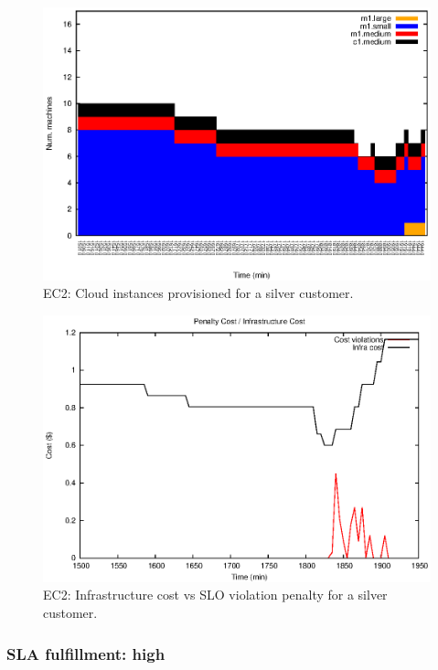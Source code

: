 \begin{figure}
  \begin{center}
    \includegraphics[width=.85\linewidth]{images/exps2011/medium/ec2/inst_type_machines_filtered.eps}
  \end{center}
\vspace{-5mm}
  \caption{EC2: Cloud instances provisioned for a silver customer.}
  \label{mediumInstances}
\end{figure}


\begin{figure}
  \begin{center}
    \includegraphics[width=.85\linewidth]{images/exps2011/medium/ec2/penaltyVScost_filtered.eps}
  \end{center}
\vspace{-5mm}
  \caption{EC2: Infrastructure cost vs SLO violation penalty for a silver customer.}
  \label{mediumPenalty}
\end{figure}

\subsubsection{SLA fulfillment: high}


